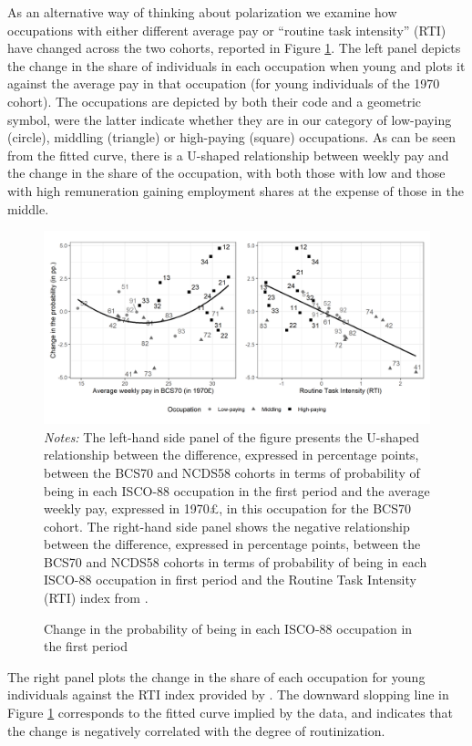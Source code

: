 As an alternative way of thinking about polarization we examine how occupations with either different average pay or  ``routine task intensity'' (RTI) have changed across the two cohorts, reported in Figure \ref{chap2-fig:polarize-both-p1}. The left panel depicts the change in the share of individuals in each occupation when young and plots it against the average pay in that occupation (for young individuals of the 1970 cohort). The occupations are depicted by both their code and a geometric symbol, were the latter indicate whether they are in our category of low-paying (circle), middling (triangle) or high-paying (square) occupations. As can be seen from the fitted curve, there is a U-shaped relationship between weekly pay and the change in the share of the occupation, with both those with low and those with high remuneration gaining employment shares at the expense of those in the middle.
\begin{figure}[!tb]
    \centering
    \caption{Change in the probability of being in each ISCO-88 occupation in the first period}
    \label{chap2-fig:polarize-both-p1}
    \includegraphics[width=\linewidth]{chap2/graphic/polarize-both-p1.png}
	\vspace{-3em}
	\justify\singlespacing\footnotesize{\textit{Notes:} The left-hand side panel of the figure presents the U-shaped relationship between the difference, expressed in percentage points, between the BCS70 and NCDS58 cohorts in terms of probability of being in each ISCO-88 occupation in the first period and the average weekly pay, expressed in 1970\pounds, in this occupation for the BCS70 cohort. The right-hand side panel shows the negative relationship between the difference, expressed in percentage points, between the BCS70 and NCDS58 cohorts in terms of probability of being in each ISCO-88 occupation in first period and the Routine Task Intensity (RTI) index from \cite{Mahutga2018Job}.}
\end{figure}
The right panel plots the change in the share of each occupation for young individuals against the RTI index provided by \cite{Mahutga2018Job}. The downward slopping line in Figure \ref{chap2-fig:polarize-both-p1} corresponds to the fitted curve implied by the data, and indicates that the change is negatively correlated with the degree of routinization. 

